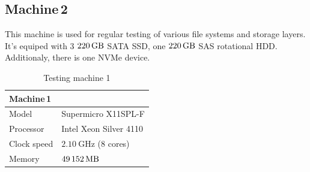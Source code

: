 \documentclass[
  color, %
  table, %
  lof,   %
  lot,   %
]{fithesis3}
\begin{document}
\subsection{Machine\,2}
\label{hw:2}
This machine is used for regular testing of various file systems and storage layers. It's equiped with 3 $\SI{220}{\giga\byte}$ SATA SSD, one $\SI{220}{\giga\byte}$ SAS rotational HDD. Additionaly, there is one NVMe device.


\begin{table}
\centering
\begin{tabular}{|l|l|}
\hline
   \multicolumn{2}{|l|}{Machine\,1} \\ \hline %
    Model & Supermicro X11SPL-F\\
    \hline
    Processor & Intel Xeon Silver 4110  \\
    \hline
    Clock speed & $\SI{2.10}{\giga\hertz}$ (8 cores) \\
    \hline
    Memory & $\SI{49152}{\mega\byte}$ \\
    \hline
\end{tabular}
\caption{Testing machine 1}
\end{table}
\end{document}
